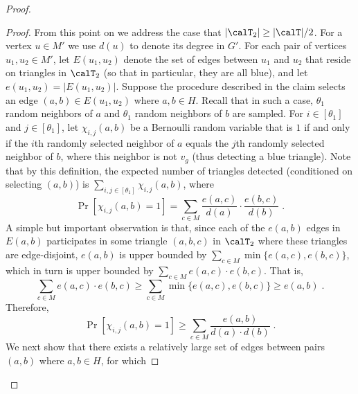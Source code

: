 \begin{proof}
\begin{proof}
From this point on we address the case that $|\calT_2| \geq |\calT|/2$. 
For a vertex $u\in M'$ we use $d(u)$ to denote its degree in $G'$. %
For each pair of vertices $u_1,u_2\in M'$, let $E(u_1,u_2)$ denote the set of edges between $u_1$ and $u_2$ that reside on triangles in $\calT_2$ (so that in particular, they are all blue), and let  $e(u_1,u_2) = |E(u_1,u_2)|$. 
Suppose the procedure described in the claim selects an edge $(a,b)\in E(u_1,u_2)$ where $a,b\in H$. Recall that in such a case, $\theta_1$ random neighbors of $a$ and $\theta_1$ random neighbors of $b$ are sampled.
For $i \in [\theta_1]$ and $j\in [\theta_1]$, let $\chi_{i,j}(a,b)$ be a Bernoulli random variable that is $1$ if and only if the $i$th randomly selected neighbor of $a$ equals the $j$th randomly selected neighbor of $b$, where this neighbor is not $v_g$ (thus detecting a blue triangle).
Note that by this definition, the expected number of triangles detected (conditioned on  selecting $(a,b)$) is
$\sum_{i,j\in [\theta_1]}\chi_{i,j}(a,b)$,
where
\begin{equation}\label{eq:a-b-c-1}
    \Pr[\chi_{i,j}(a,b)=1]= \sum_{c\in M}\frac{e(a,c)}{d(a)}\cdot \frac{e(b,c)}{d(b)}\;.
\end{equation}
A simple but important observation is that, since each of the $e(a,b)$ edges in $E(a,b)$ participates in some triangle $(a,b,c)$ in $\calT_2$ where these triangles are edge-disjoint, $e(a,b)$ is upper bounded by
$\sum_{c \in M} \min\{e(a,c),e(b,c)\}$, which in turn is upper bounded by
$\sum_{c\in M} e(a,c)\cdot e(b,c)$. 
That is, 
$$\sum_{c\in M} e(a,c)\cdot e(b,c)\geq \sum_{c \in M} \min\{e(a,c),e(b,c)\} \geq e(a,b)\;.$$
Therefore,
\begin{equation}\label{eq:a-b-c-2}
    \Pr[\chi_{i,j}(a,b)=1] \geq \sum_{c\in M}\frac{e(a,b)}{d(a)\cdot d(b)}\;.
\end{equation}
We next show that there exists a relatively large set of edges between  pairs $(a,b)$ where $a,b \in H$, for which

\end{proof}
\end{proof}
